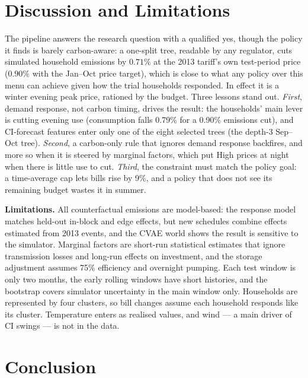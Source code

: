 \documentclass[11pt]{article}
\newcommand{\pct}[1]{$#1\%$}
\begin{document}
\section{Discussion and Limitations}

The pipeline answers the research question with a qualified yes, though the policy it finds is barely carbon-aware: a
one-split tree, readable by any regulator, cuts simulated household emissions by \pct{0.71} at the 2013 tariff's own
test-period price (\pct{0.90} with the Jan--Oct price target), which is close to what any policy over this menu can
achieve given how the trial households responded. In effect it is a winter evening peak price, rationed by the budget.
Three lessons stand out.
\emph{First}, demand response, not carbon timing, drives the result: the households' main lever is cutting evening
use (consumption falls 0.79\% for a 0.90\% emissions cut), and CI-forecast features enter only one of the eight selected
trees (the depth-3 Sep--Oct tree). \emph{Second}, a carbon-only rule that ignores demand response backfires, and more so
when it is steered by marginal factors, which put High prices at night when there is little use to cut.
\emph{Third}, the constraint must match the policy goal: a time-average cap lets bills rise by 9\%, and a policy that
does not see its remaining budget wastes it in summer.

\textbf{Limitations.} All counterfactual emissions are model-based: the response model matches held-out in-block and
edge effects, but new schedules combine effects estimated from 2013 events, and the CVAE world shows the result is
sensitive to the simulator. Marginal factors are short-run statistical estimates that ignore transmission losses and
long-run effects on investment, and the storage adjustment assumes 75\% efficiency and overnight pumping. Each test
window is only two months, the early rolling windows have short histories, and the bootstrap covers simulator
uncertainty in the main window only. Households are represented by four clusters, so bill changes assume each household
responds like its cluster. Temperature enters as realised values, and wind --- a main driver of CI swings --- is not in
the data.

\section{Conclusion}
\end{document}
